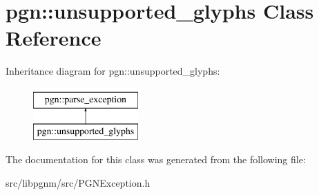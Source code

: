 \hypertarget{classpgn_1_1unsupported__glyphs}{
\section{pgn::unsupported\_\-glyphs Class Reference}
\label{classpgn_1_1unsupported__glyphs}
}
Inheritance diagram for pgn::unsupported\_\-glyphs:\begin{figure}[H]
\begin{center}
\leavevmode
\includegraphics[height=2.000000cm]{classpgn_1_1unsupported__glyphs}
\end{center}
\end{figure}


The documentation for this class was generated from the following file:\begin{DoxyCompactItemize}
\item 
src/libpgnm/src/PGNException.h\end{DoxyCompactItemize}
